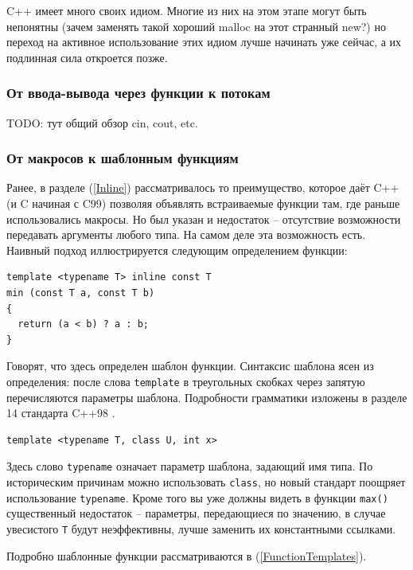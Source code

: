 \documentclass[a4paper,12pt,oneside]{article}
\begin{document}
C++ имеет много своих идиом. Многие из них на этом этапе могут быть непонятны (зачем заменять такой хороший malloc на этот странный new?) но переход на активное использование этих идиом лучше начинать уже сейчас, а их подлинная сила откроется позже.

\subsubsection{От ввода-вывода через функции к потокам}\label{PrintfToCout}

TODO: тут общий обзор cin, cout, etc.

\subsubsection{От макросов к шаблонным функциям}\label{FunctionTemplate}

Ранее, в разделе (\ref{Inline}) рассматривалось то преимущество, которое даёт C++ (и C начиная с C99) позволяя объявлять встраиваемые функции там, где раньше использовались макросы. Но был указан и недостаток -- отсутствие возможности передавать аргументы любого типа. На самом деле эта возможность есть. Наивный подход иллюстрируется следующим определением функции:

\begin{lstlisting}
template <typename T> inline const T
min (const T a, const T b)
{
  return (a < b) ? a : b;
}
\end{lstlisting}

Говорят, что здесь определен шаблон функции. Синтаксис шаблона ясен из определения: после слова \lstinline!template! в треугольных скобках через запятую перечисляются параметры шаблона. Подробности грамматики изложены в разделе 14 стандарта C++98 \cite{stdcpp98}.

\begin{lstlisting}
template <typename T, class U, int x>
\end{lstlisting}

Здесь слово \lstinline!typename! означает параметр шаблона, задающий имя типа. По историческим причинам можно использовать \lstinline!class!, но новый стандарт поощряет использование \lstinline!typename!. Кроме того вы уже должны видеть в функции \lstinline!max()! существенный недостаток – параметры, передающиеся по значению, в случае увесистого \lstinline!T! будут неэффективны, лучше заменить их константными ссылками.

Подробно шаблонные функции рассматриваются в (\ref{FunctionTemplates}).
\end{document}
